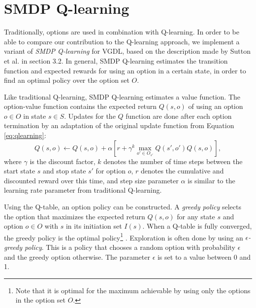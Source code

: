 \chapter{SMDP Q-learning}

Traditionally, options are used in combination with Q-learning. In order to be
able to compare our contribution to the Q-learning approach, we implement a
variant of \emph{SMDP Q-learning} \cite{sutton1999between} for VGDL, based on
the description made by Sutton et al. in section 3.2. In general, SMDP
Q-learning estimates the transition function and expected rewards for using an
option in a certain state, in order to find an optimal policy over the option
set $O$.

Like traditional Q-learning, SMDP Q-learning estimates a value function. The
option-value function contains the expected return $Q(s, o)$ of using
an option $o \in O$ in state $s \in S$. Updates for the $Q$ function are done
after each option termination by an adaptation of the original update function
from Equation \ref{eq:qlearning}:
\begin{equation}
	\label{eq:smdp-qlearning}
	Q(s, o) \gets Q(s, o) + \alpha \left[r + \gamma^k \max_{o' \in O_{s'}}Q(s',
	o') Q(s, o)\right],
\end{equation}
where $\gamma$ is the discount factor, $k$ denotes the number of time steps
between the start state $s$ and stop state $s'$ for option $o$, $r$ denotes
the cumulative and discounted reward over this time, and step size parameter
$\alpha$ is similar to the learning rate parameter from traditional Q-learning.

Using the Q-table, an option policy can be constructed. A \emph{greedy policy}
selects the option that maximizes the expected return $Q(s, o)$ for any state
$s$ and option $o \in O$ with $s$ in its initiation set $I(s)$. When a Q-table
is fully converged, the greedy policy is the optimal policy\footnote{Note that
it is optimal for the maximum achievable by using only the options in the option
set $O$.} \cite{sutton1999between}. Exploration is often done by using an
\emph{$\epsilon$-greedy policy}. This is a policy that chooses a random option
with probability $\epsilon$ and the greedy option otherwise. The parameter
$\epsilon$ is set to a value between 0 and 1.

